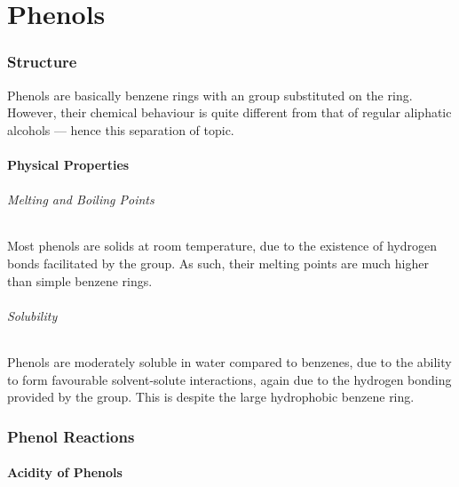 

\pagebreak
\hypertarget{ChapterPhenols}{}
\part{Phenols}

	\section{Structure}

		Phenols are basically benzene rings with an  group substituted on the ring. However, their chemical behaviour is quite
		different from that of regular aliphatic alcohols –– hence this separation of topic.



		\subsection{Physical Properties}

			\paragraph{Melting and Boiling Points}

			Most phenols are solids at room temperature, due to the existence of hydrogen bonds facilitated by the  group. As such,
			their melting points are much higher than simple benzene rings.


			\paragraph{Solubility}

			Phenols are moderately soluble in water compared to benzenes, due to the ability to form favourable solvent-solute interactions,
			again due to the hydrogen bonding provided by the  group. This is despite the large hydrophobic benzene ring.



	\section{Phenol Reactions}

		\subsection{Acidity of Phenols}

